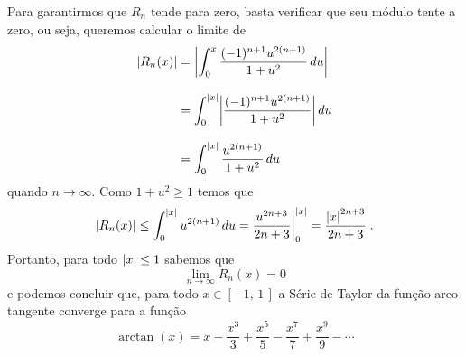 Para garantirmos que $R_n$ tende para zero, basta verificar que seu módulo tente a zero,
ou seja, queremos calcular o limite de
\begin{align*}
  \abs{R_n(x)}
  & = \abs{\int_0^x \frac{(-1)^{n+1} u^{2(n+1)}}{1+u^2} \,du} \\[3mm]
  & = \int_0^{\abs{x}} \abs{\frac{(-1)^{n+1} u^{2(n+1)}}{1+u^2}} \,du \\[3mm]
  & = \int_0^{\abs{x}} \frac{u^{2(n+1)}}{1+u^2} \,du
\end{align*}
quando $n\to\infty$. Como $1+u^2\geq 1$ temos que
\[
\abs{R_n(x)}
\leq \int_0^{\abs{x}} u^{2(n+1)} \,du
= \frac{u^{2n+3}}{2n+3} \evalat{0}{\abs{x}}
= \frac{\abs{x}^{2n+3}}{2n+3}    \;.
\]
Portanto, para todo $\abs{x} \leq 1$ sabemos que
\[
\lim_{n\to\infty} R_n(x) = 0
\]
e podemos concluir que, para todo $x\in[-1,\,1\,]$ a Série de Taylor da função
arco tangente converge para a função
\[
\arctan(x) = x - \frac{x^3}{3}
+ \frac{x^5}{5}
- \frac{x^7}{7}
+ \frac{x^9}{9}
- \cdots
\]

